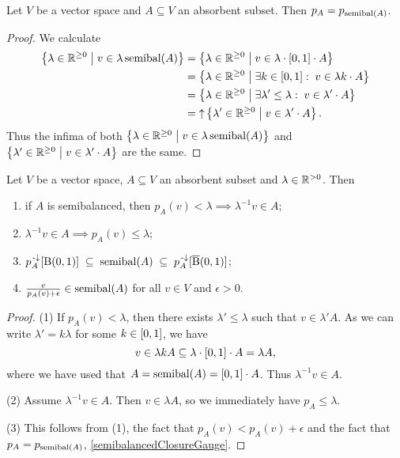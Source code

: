 \begin{lemma} \label{semibalancedClosureGauge}
Let $V$ be a vector space and $A\subseteq V$ an absorbent subset. Then $p_A = p_{\operatorname{semibal}(A)}$.
\end{lemma}
\begin{proof}
We calculate
\begin{align*}
\setbuilder{\lambda\in\R^{\geq 0}}{v\in \lambda \semibalanced(A)} &= \setbuilder{\lambda\in\R^{\geq 0}}{v\in \lambda\cdot\interval{0,1}\cdot A} \\
&= \setbuilder{\lambda\in\R^{\geq 0}}{\exists k\in \interval{0,1}:\; v\in \lambda k\cdot A} \\
&= \setbuilder{\lambda\in\R^{\geq 0}}{\exists \lambda'\leq \lambda:\; v\in \lambda' \cdot A} \\
&= \upset \setbuilder{\lambda'\in\R^{\geq 0}}{v\in \lambda' \cdot A}.
\end{align*}
Thus the infima of both $\left\{ \lambda\in\mathbb{R}^{\geq 0} \;\middle|\; v\in \lambda \operatorname{semibal}(A) \right\}$ and $\left\{ \lambda'\in\mathbb{R}^{\geq 0} \;\middle|\; v\in \lambda' \cdot A \right\}$ are the same.
\end{proof}

\begin{lemma} \label{gaugeLemma}
Let $V$ be a vector space, $A\subseteq V$ an absorbent subset and $\lambda\in \mathbb{R}^{> 0}$. Then
\begin{enumerate}
\item if $A$ is semibalanced, then $p_A(v) < \lambda \implies \lambda^{-1}v\in A$;
\item $\lambda^{-1}v\in A \implies p_A(v) \leq \lambda$;
\item $p_A^{{\text{\hspace{0.15em}-}\downarrow}}[\operatorname{B}(0,1)] \;\subseteq\; \operatorname{semibal}(A) \;\subseteq\; p_A^{{\text{\hspace{0.15em}-}\downarrow}}[\operatorname{\overline{B}}(0,1)]$;
\item $\frac{v}{p_A(v)+\epsilon} \in \operatorname{semibal}(A)$ for all $v\in V$ and $\epsilon >0$.
\end{enumerate}
\end{lemma}
\begin{proof}
(1) If $p_A(v) < \lambda$, then there exists $\lambda' \leq \lambda$ such that $v\in \lambda' A$. As we can write $\lambda' = k\lambda$ for some $k\in\interval{0,1}$, we have
\[ v\in \lambda k A \subseteq \lambda \cdot \interval{0,1}\cdot A = \lambda A, \]
where we have used that $A = \semibalanced(A) = \interval{0,1}\cdot A$. Thus $\lambda^{-1}v \in A$.

(2) Assume $\lambda^{-1}v \in A$. Then $v\in \lambda A$, so we immediately have $p_A \leq \lambda$.

(3) This follows from (1), the fact that $p_A(v) < p_A(v) + \epsilon$ and the fact that $p_A = p_{\operatorname{semibal}(A)}$, \ref{semibalancedClosureGauge}.
\end{proof}


